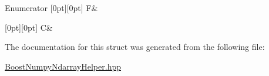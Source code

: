 \begin{DoxyEnumFields}{Enumerator}
[0pt][0pt]{}\mbox{\label{struct_num_cpp_1_1_order_a1ec7189cd22800f34d163dec75732c7fa6a68c16c626bc86510e01a394eb96c80}} 
F&\\
\hline

[0pt][0pt]{}\mbox{\label{struct_num_cpp_1_1_order_a1ec7189cd22800f34d163dec75732c7fac8351f23be54b8549a412ab0f4a0543d}} 
C&\\
\hline

\end{DoxyEnumFields}


The documentation for this struct was generated from the following file\+:\begin{DoxyCompactItemize}
\item 
\mbox{\hyperlink{_boost_numpy_ndarray_helper_8hpp}{Boost\+Numpy\+Ndarray\+Helper.\+hpp}}\end{DoxyCompactItemize}
